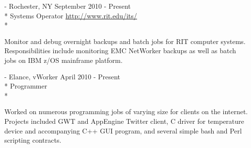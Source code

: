 \documentclass[letter,margin,line]{resume}
\newcommand{\rurl}[1]{\hfill {\footnotesize \url{#1}}}
\newcommand{\rdate}[1]{\hfill {\small #1}}
\renewcommand{\employer}[5]{\item[#1] - #2 \rdate{#3} \\* #4 \rurl{#5} \\*}
\begin{document}
\begin{resume}
\begin{asparadesc}
		\employer{RIT Information \& Technology Services}{Rochester, NY}{September 2010 - Present}{Systems Operator}{http://www.rit.edu/its/}

		\small
		Monitor and debug overnight backups and batch jobs for RIT
		computer systems. Responsibilities include monitoring EMC NetWorker backups as well as batch jobs on IBM z/OS mainframe platform.
		\normalsize
		\\
		
		\employer{Freelance Programmer}{Elance, vWorker}{April 2010 - Present}{Programmer}{}
		
		\small Worked on numerous programming jobs of varying size for clients on the internet. Projects included GWT and AppEngine Twitter client, C driver for temperature device and accompanying C++ GUI program, and several simple bash and Perl scripting contracts.
		\normalsize
		\\
	\end{asparadesc}


\end{resume}
\end{document}
